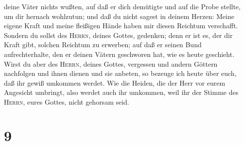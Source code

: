 deine Väter nichts wußten, auf daß er dich demütigte und auf die Probe
stellte, um dir hernach wohlzutun;  und daß du nicht
sagest in deinem Herzen: Meine eigene Kraft und meine fleißigen Hände
haben mir diesen Reichtum verschafft.  Sondern du sollst
des \textsc{Herrn}, deines Gottes, gedenken; denn er ist es, der dir
Kraft gibt, solchen Reichtum zu erwerben; auf daß er seinen Bund
aufrechterhalte, den er deinen Vätern geschworen hat, wie es heute
geschieht.  Wirst du aber des \textsc{Herrn}, deines
Gottes, vergessen und andern Göttern nachfolgen und ihnen dienen und sie
anbeten, so bezeuge ich heute über euch, daß ihr gewiß umkommen werdet.
 Wie die Heiden, die der Herr vor eurem Angesicht
umbringt, also werdet auch ihr umkommen, weil ihr der Stimme des
\textsc{Herrn}, eures Gottes, nicht gehorsam seid.

\hypertarget{section-8}{%
\section{9}\label{section-8}}

